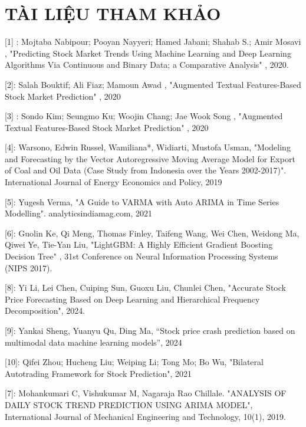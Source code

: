 \documentclass[conference]{IEEEtran}
\begin{document}
\section*{TÀI LIỆU THAM KHẢO}


[1] : Mojtaba Nabipour; Pooyan Nayyeri; Hamed Jabani; Shahab S.; Amir Mosavi , "Predicting Stock Market Trends Using Machine Learning and Deep Learning Algorithms Via Continuous and Binary Data; a Comparative Analysis" , 2020. 

[2]: Salah Bouktif; Ali Fiaz; Mamoun Awad , "Augmented Textual Features-Based Stock Market Prediction" , 2020 

[3] : Sondo Kim; Seungmo Ku; Woojin Chang; Jae Wook Song , "Augmented Textual Features-Based Stock Market Prediction" , 2020 


[4]: Warsono, Edwin Russel, Wamiliana*, Widiarti, Mustofa Usman, "Modeling and Forecasting by the Vector Autoregressive Moving Average Model for Export of Coal and Oil Data (Case Study from Indonesia over the Years 2002-2017)". International Journal of Energy Economics and Policy, 2019

[5]: Yugesh Verma, "A Guide to VARMA with Auto ARIMA in Time Series Modelling". analyticsindiamag.com, 2021 

[6]: Guolin Ke, Qi Meng, Thomas Finley, Taifeng Wang, Wei Chen, Weidong Ma, Qiwei Ye, Tie-Yan Liu, "LightGBM: A Highly Efficient Gradient Boosting
Decision Tree" , 31st Conference on Neural Information Processing Systems (NIPS 2017).


[8]: Yi Li, Lei Chen, Cuiping Sun, Guoxu Liu, Chunlei Chen, "Accurate Stock Price Forecasting Based on Deep Learning and Hierarchical Frequency Decomposition", 2024.

[9]: Yankai Sheng,  Yuanyu Qu,  Ding Ma, “Stock price crash prediction based on multimodal data machine learning models”, 2024

[10]: Qifei Zhou; Hucheng Liu; Weiping Li; Tong Mo; Bo Wu, "Bilateral Autotrading Framework for Stock Prediction", 2021



[7]: Mohankumari C, Vishukumar M, Nagaraja Rao Chillale. "ANALYSIS OF DAILY STOCK TREND PREDICTION USING ARIMA MODEL", International Journal
of Mechanical Engineering and Technology, 10(1), 2019.
\end{document}
